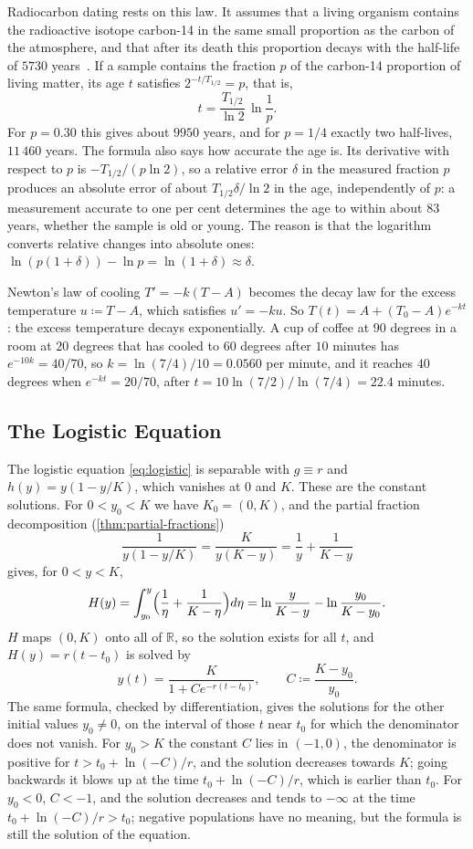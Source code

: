 Radiocarbon dating rests on this law. It assumes that a living organism contains the radioactive isotope carbon-14 in the same small proportion as the carbon of the atmosphere, and that after its death this proportion decays with the half-life of $5730$ years~\cite{godwin1962}. If a sample contains the fraction $p$ of the carbon-14 proportion of living matter, its age $t$ satisfies $2^{-t/T_{1/2}}=p$, that is,
\[
t=\frac{T_{1/2}}{\ln2}\,\ln\frac1p .
\]
For $p=0.30$ this gives about $9950$ years, and for $p=1/4$ exactly two half-lives, $11\,460$ years. The formula also says how accurate the age is. Its derivative with respect to $p$ is $-T_{1/2}/(p\ln2)$, so a relative error $\delta$ in the measured fraction $p$ produces an absolute error of about $T_{1/2}\delta/\ln2$ in the age, independently of $p$: a measurement accurate to one per cent determines the age to within about $83$ years, whether the sample is old or young. The reason is that the logarithm converts relative changes into absolute ones: $\ln(p(1+\delta))-\ln p=\ln(1+\delta)\approx\delta$.

Newton's law of cooling $T'=-k(T-A)$ becomes the decay law for the excess temperature $u\coloneqq T-A$, which satisfies $u'=-ku$. So $T(t)=A+(T_0-A)e^{-kt}$: the excess temperature decays exponentially. A cup of coffee at $90$ degrees in a room at $20$ degrees that has cooled to $60$ degrees after $10$ minutes has $e^{-10k}=40/70$, so $k=\ln(7/4)/10=0.0560$ per minute, and it reaches $40$ degrees when $e^{-kt}=20/70$, after $t=10\ln(7/2)/\ln(7/4)=22.4$ minutes.

\subsection{The Logistic Equation}

The logistic equation \eqref{eq:logistic} is separable with $g\equiv r$ and $h(y)=y(1-y/K)$, which vanishes at $0$ and $K$. These are the constant solutions. For $0<y_0<K$ we have $K_0=(0,K)$, and the partial fraction decomposition (\cref{thm:partial-fractions})
\[
\frac1{y(1-y/K)}=\frac K{y(K-y)}=\frac1y+\frac1{K-y}
\]
gives, for $0<y<K$,
\[
H(y)=\int_{y_0}^y\Bigl(\frac1\eta+\frac1{K-\eta}\Bigr)d\eta=\ln\frac y{K-y}-\ln\frac{y_0}{K-y_0} .
\]
$H$ maps $(0,K)$ onto all of $\mathbb R$, so the solution exists for all $t$, and $H(y)=r(t-t_0)$ is solved by
\begin{equation}
y(t)=\frac K{1+Ce^{-r(t-t_0)}},\qquad C\coloneqq\frac{K-y_0}{y_0}.
\label{eq:logistic-solution}
\end{equation}
The same formula, checked by differentiation, gives the solutions for the other initial values $y_0\ne0$, on the interval of those $t$ near $t_0$ for which the denominator does not vanish. For $y_0>K$ the constant $C$ lies in $(-1,0)$, the denominator is positive for $t>t_0+\ln(-C)/r$, and the solution decreases towards $K$; going backwards it blows up at the time $t_0+\ln(-C)/r$, which is earlier than $t_0$. For $y_0<0$, $C<-1$, and the solution decreases and tends to $-\infty$ at the time $t_0+\ln(-C)/r>t_0$; negative populations have no meaning, but the formula is still the solution of the equation.

